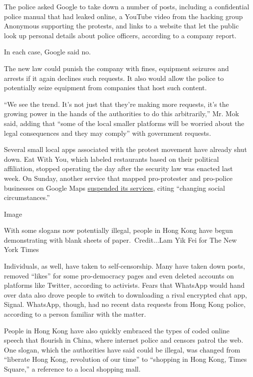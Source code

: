 The police asked Google to take down a number of posts, including a
confidential police manual that had leaked online, a YouTube video from
the hacking group Anonymous supporting the protests, and links to a
website that let the public look up personal details about police
officers, according to a company report.

In each case, Google said no.

The new law could punish the company with fines, equipment seizures and
arrests if it again declines such requests. It also would allow the
police to potentially seize equipment from companies that host such
content.

``We see the trend. It's not just that they're making more requests,
it's the growing power in the hands of the authorities to do this
arbitrarily,'' Mr. Mok said, adding that ``some of the local smaller
platforms will be worried about the legal consequences and they may
comply'' with government requests.

Several small local apps associated with the protest movement have
already shut down. Eat With You, which labeled restaurants based on
their political affiliation, stopped operating the day after the
security law was enacted last week. On Sunday, another service that
mapped pro-protester and pro-police businesses on Google Maps
\href{https://t.me/yellowshoppromotion/1044}{suspended its services},
citing ``changing social circumstances.''

Image

With some slogans now potentially illegal, people in Hong Kong have
begun demonstrating with blank sheets of paper.~Credit...Lam Yik Fei for
The New York Times

Individuals, as well, have taken to self-censorship. Many have taken
down posts, removed ``likes'' for some pro-democracy pages and even
deleted accounts on platforms like Twitter, according to activists.
Fears that WhatsApp would hand over data also drove people to switch to
downloading a rival encrypted chat app, Signal. WhatsApp, though, had no
recent data requests from Hong Kong police, according to a person
familiar with the matter.

People in Hong Kong have also quickly embraced the types of coded online
speech that flourish in China, where internet police and censors patrol
the web. One slogan, which the authorities have said could be illegal,
was changed from ``liberate Hong Kong, revolution of our time'' to
``shopping in Hong Kong, Times Square,'' a reference to a local shopping
mall.

